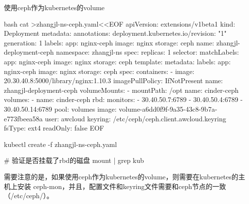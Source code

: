 \begin{outline}[enumerate]
\1 使用ceph作为kubernetes的volume
\begin{code-block}{bash}
cat >zhangjl-ns-ceph.yaml<<EOF
apiVersion: extensions/v1beta1
kind: Deployment
metadata:
  annotations:
    deployment.kubernetes.io/revision: "1"
  generation: 1
  labels:
    app: nginx-ceph
    image: nginx
    storage: ceph
  name: zhangjl-deployment-ceph
  namespace: zhangjl-ns
spec:
  replicas: 1
  selector:
    matchLabels:
      app: nginx-ceph
      image: nginx
      storage: ceph
  template:
    metadata:
      labels:
        app: nginx-ceph
        image: nginx
        storage: ceph
    spec:
      containers:
      - image: 20.30.40.8:5000/library/nginx:1.10.3
        imagePullPolicy: IfNotPresent
        name: zhangjl-deployment-ceph
        volumeMounts:
        - mountPath: /opt
          name: cinder-ceph
      volumes:
      - name: cinder-ceph
        rbd:
          monitors:
          - 30.40.50.7:6789
          - 30.40.50.4:6789
          - 30.40.50.14:6789
          pool: volumes
          image: volume-a6dd0f9f-9a35-43c8-9b7a-e773fbeea58a
          user: awcloud
          keyring: /etc/ceph/ceph.client.awcloud.keyring
          fsType: ext4
          readOnly: false
EOF

kubectl create -f zhangjl-ns-ceph.yaml

# 验证是否挂载了rbd的磁盘
mount | grep kub
\end{code-block}
需要注意的是，如果使用ceph作为kubernetes的volume，则需要在kubernetes的主机上安装
ceph-mon，并且，配置文件和keyring文件需要和ceph节点的一致（/etc/ceph/）。


\end{outline}

